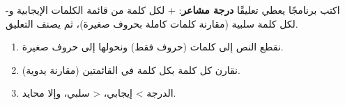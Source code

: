 \begin{statement}
اكتب برنامجًا يعطي تعليقًا \textbf{درجة مشاعر}: + لكل كلمة من قائمة الكلمات الإيجابية و- لكل كلمة سلبية (مقارنة كلمات كاملة بحروف صغيرة)، ثم يصنف التعليق.
\end{statement}
\begin{stepsbox}\begin{enumerate}
\item نقطع النص إلى كلمات (حروف فقط) ونحولها إلى حروف صغيرة.
\item نقارن كل كلمة بكل كلمة في القائمتين (مقارنة يدوية).
\item الدرجة >  إيجابي، <  سلبي، وإلا محايد.
\end{enumerate}\end{stepsbox}
